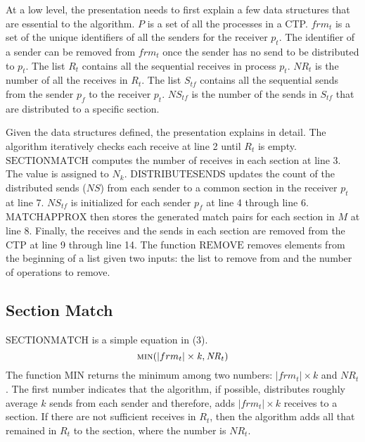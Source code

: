 At a low level, the presentation needs to first explain a few data structures that are essential to the algorithm.
$\mathit{P}$ is a set of all the processes in a CTP. 
$frm_t$ is a set of the unique identifiers of all the senders for the receiver $p_t$. 
The identifier of a sender can be removed from $frm_t$ once the sender has no send to be distributed to $p_t$.
The list $R_t$ contains all the sequential receives in process $p_t$.
$\mathit{NR}_{t}$ is the number of all the receives in $R_t$.
The list $S_{tf}$ contains all the sequential sends from the sender $p_f$ to the receiver $p_t$. 
$\mathit{NS}_{tf}$ is the number of the sends in $S_{tf}$ that are distributed to a specific section.

Given the data structures defined, the presentation explains  in detail.
The algorithm iteratively checks each receive at line 2 until $R_t$ is empty.  
$\mathrm{SECTIONMATCH}$ computes the number of receives in each section at line 3. The value is assigned to $N_k$. 
$\mathrm{DISTRIBUTESENDS}$ updates the count of the distributed sends ($\mathit{NS}$) from each sender to a common section in the receiver $p_t$ at line 7. 
$\mathit{NS_{tf}}$ is initialized for each sender $p_f$ at line 4 through line 6.
$\mathrm{MATCHAPPROX}$ then stores the generated match pairs for each section in $M$ at line 8. 
Finally, the receives and the sends in each section are removed from the CTP at line 9 through line 14. 
The function $\mathrm{REMOVE}$ removes elements from the beginning of a list given two inputs: the list to remove from and the number of operations to remove. 

\subsection{Section Match}

$\mathrm{SECTIONMATCH}$ is a simple equation in (3).
\begin{equation}
\Call{min}{|frm_t|\times\mathit{k}, \mathit{NR}_{t}}
\end{equation}
The function $\mathrm{MIN}$ returns the minimum among two numbers: $|frm_t|\times\mathit{k}$ and $\mathit{NR}_{t}$.
The first number indicates that the algorithm, if possible, distributes roughly average $k$  sends from each sender and therefore, adds $|frm_t|\times\mathit{k}$ receives to a section. If there are not sufficient receives in $R_t$, then the algorithm adds all that remained in $R_t$ to the section, where the number is $\mathit{NR}_{t}$.


